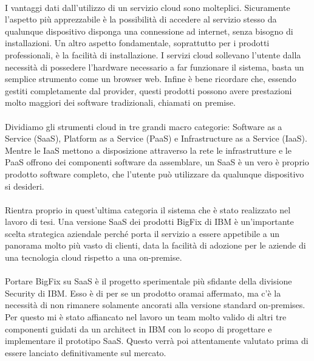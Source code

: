 \paragraph{}
I vantaggi dati dall'utilizzo di un servizio cloud sono molteplici. Sicuramente l'aspetto più apprezzabile è la possibilità di accedere al servizio stesso da qualunque dispositivo disponga una connessione ad internet, senza bisogno di installazioni. Un altro aspetto fondamentale, soprattutto per i prodotti professionali, è la facilità di installazione. I servizi cloud sollevano l'utente dalla necessità di possedere l'hardware necessario a far funzionare il sistema, basta un semplice strumento come un browser web. Infine è bene ricordare che, essendo gestiti completamente dal provider, questi prodotti possono avere prestazioni molto maggiori dei software tradizionali, chiamati on premise.
\paragraph{}
Dividiamo gli strumenti cloud in tre grandi macro categorie: Software as a Service (SaaS), Platform as a Service (PaaS) e Infrastructure as a Service (IaaS). Mentre le IaaS mettono a disposizione attraverso la rete le infrastrutture e le PaaS offrono dei componenti software da assemblare, un SaaS è un vero è proprio prodotto software completo, che l'utente può utilizzare da qualunque dispositivo si desideri.

\paragraph{}
Rientra proprio in quest'ultima categoria il sistema che è stato realizzato nel lavoro di tesi. Una versione SaaS dei prodotti BigFix di IBM è un'importante scelta strategica aziendale perché porta il servizio a essere appetibile a un panorama molto più vasto di clienti, data la facilità di adozione per le aziende di una tecnologia cloud rispetto a una on-premise.
\paragraph{}
Portare BigFix su SaaS è il progetto sperimentale più sfidante della divisione Security di IBM. Esso è di per se un prodotto oramai affermato, ma c'è la necessità di non rimanere solamente ancorati alla versione standard on-premises. Per questo mi è stato affiancato nel lavoro un team molto valido di altri tre componenti guidati da un architect in IBM con lo scopo di progettare e implementare il prototipo SaaS. Questo verrà poi attentamente valutato prima di essere lanciato definitivamente sul mercato.

